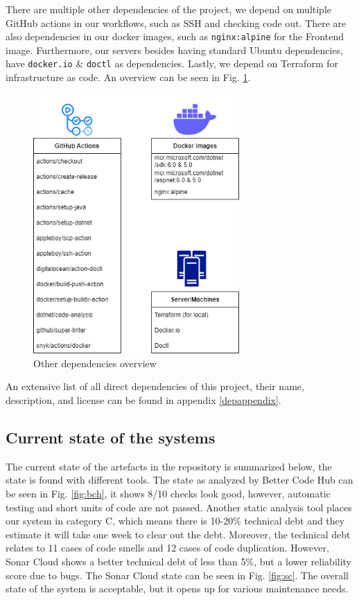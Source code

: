 \documentclass[10pt]{article}
\begin{document}
There are multiple other dependencies of the project, we depend on multiple GitHub actions in our workflows, such as SSH and checking code out. There are also dependencies in our docker images, such as \texttt{nginx:alpine} for the Frontend image. Furthermore, our servers besides having standard Ubuntu dependencies, have \texttt{docker.io} \& \texttt{doctl} as dependencies. Lastly, we depend on Terraform for infrastructure as code. An overview can be seen in Fig. \ref{fig:otherdep}.

\begin{figure} [H]
  \centering
  \includegraphics[width=0.7\textwidth]{images/devops-otherdependencies.png}
  \caption{Other dependencies overview}
  \label{fig:otherdep}
\end{figure}

An extensive list of all direct dependencies of this project, their name, description, and license can be found in appendix \ref{depappendix}.


\subsection{Current state of the systems}
The current state of the artefacts in the repository is summarized below, the state is found with different tools.
The state as analyzed by Better Code Hub can be seen in Fig. \ref{fig:bch}, it shows 8/10 checks look good, however, automatic testing and short units of code are not passed. Another static analysis tool places our system in category C, which means there is 10-20\% technical debt and they estimate it will take one week to clear out the debt. Moreover, the technical debt relates to 11 cases of code smells and 12 cases of code duplication. However, Sonar Cloud shows a better technical debt of less than 5\%, but a lower reliability score due to bugs. The Sonar Cloud state can be seen in Fig. \ref{fig:sc}. The overall state of the system is acceptable, but it opens up for various maintenance needs.
\end{document}
